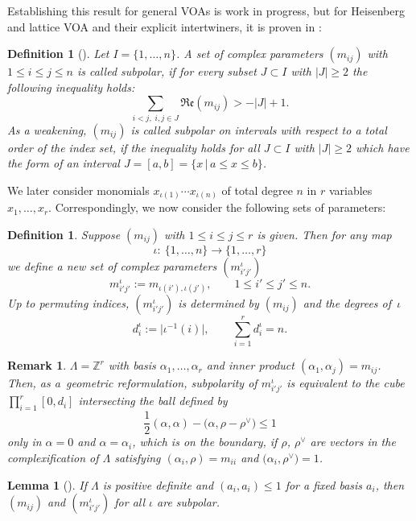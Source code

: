 \documentclass[pdftex]{sigma}%
\numberwithin{equation}{section}
\newtheorem{lem}[teo]{Lemma}
\newtheorem{defin}[teo]{Definition}
\newtheorem{oss}[teo]{Remark} }
\newcommand{\Z}{\mathbb{Z}}
\begin{document}
Establishing this result for general VOAs is work in progress, but for Heisenberg and lattice VOA and their explicit intertwiners, it is proven in \cite{Len17}:
\begin{defin}[{\cite[Definition 5.4]{Len17}}]\label{def_smallnessF}
	Let $I=\{1,\dots,n\}$. A set of complex parameters $(m_{ij})$ with $1\leq i\leq j\leq n$ is called \emph{subpolar}, if for every subset $J\subset I$ with $|J|\geq 2$ the following inequality holds:
	\[\sum_{i<j,\;i,j\in J} \mathfrak{Re}(m_{ij}) > -|J|+1.\]
	As a weakening, $(m_{ij})$ is called \emph{subpolar on intervals} with respect to a total order of the index set, if the inequality holds for all $J\subset I$ with $|J|\geq 2$ which have the form of an interval $J=[a,b]=\{x\,|\, a\leq x \leq b\}$.
\end{defin}
We later consider monomials $x_{\iota(1)}\cdots x_{\iota(n)}$ of total degree $n$ in $r$ variables $x_1,\dots,x_r$. Correspondingly, we now consider the following sets of parameters:
\begin{defin}
Suppose $(m_{ij})$ with $1\leq i\leq j\leq r$ is given. Then for any map
\[\iota\colon \ \{1,\dots,n \}\to \{1,\dots, r\}\]
we define a new set of complex parameters $(m^\iota_{i'j'})$
\[m^\iota_{i'j'}:=m_{\iota(i'),\iota(j')},\qquad 1\leq i'\leq j'\leq n.\]
Up to permuting indices, $(m^\iota_{i'j'})$ is determined by $(m_{ij})$ and the \emph{degrees} of~$\iota$
\[d_i^\iota:=\big|\iota^{-1}(i)\big|,\qquad \sum_{i=1}^r d_i^\iota=n.\]
\end{defin}
\begin{oss}
		 $\Lambda=\Z^r$ with basis $\alpha_1,\dots,\alpha_r$ and inner product $(\alpha_1,\alpha_j)=m_{ij}$. Then, as a~geometric reformulation, subpolarity of $m^\iota_{i'j'}$ is equivalent to the cube $\prod_{i=1}^r[0,d_i]$ intersecting the ball defined by
\[\frac{1}{2}(\alpha,\alpha)-\big(\alpha,\rho-\rho^\vee\big)\leq 1\]
only in $\alpha=0$ and $\alpha=\alpha_i$, which is on the boundary, if $\rho$, $\rho^\vee$ are vectors in the complexification of $\Lambda$ satisfying $(\alpha_i,\rho)=m_{ii}$ and $\big(\alpha_i,\rho^\vee\big)=1$.
\end{oss}

\begin{lem}[{\cite[Lemma 5.5]{Len17}}]\label{pos+small} If $\Lambda$ is positive definite and $(a_i, a_i)\leq 1$ for a fixed basis $a_i$, then $(m_{ij})$ and $(m^\iota_{i'j'})$ for all $\iota$ are subpolar.
\end{lem}
\end{document}
